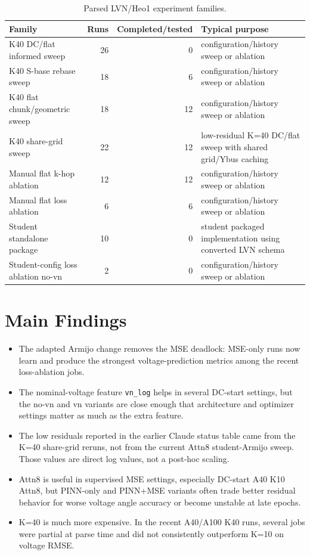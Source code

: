 \documentclass[10pt]{article}
\begin{document}
\begin{table}[h]
\centering
\caption{Parsed LVN/Heo1 experiment families.}
\scriptsize
\begin{tabular}{lrrl}
\toprule
Family & Runs & Completed/tested & Typical purpose \\
\midrule
K40 DC/flat informed sweep & 26 & 0 & configuration/history sweep or ablation \\
K40 S-base rebase sweep & 18 & 6 & configuration/history sweep or ablation \\
K40 flat chunk/geometric sweep & 18 & 12 & configuration/history sweep or ablation \\
K40 share-grid sweep & 22 & 12 & low-residual K=40 DC/flat sweep with shared grid/Ybus caching \\
Manual flat k-hop ablation & 12 & 12 & configuration/history sweep or ablation \\
Manual flat loss ablation & 6 & 6 & configuration/history sweep or ablation \\
Student standalone package & 10 & 0 & student packaged implementation using converted LVN schema \\
Student-config loss ablation no-vn & 2 & 0 & configuration/history sweep or ablation \\
\bottomrule
\end{tabular}
\end{table}


\section{Main Findings}
\begin{itemize}
\item The adapted Armijo change removes the MSE deadlock: MSE-only runs now learn and produce the strongest voltage-prediction metrics among the recent loss-ablation jobs.
\item The nominal-voltage feature \texttt{vn\_log} helps in several DC-start settings, but the no-vn and vn variants are close enough that architecture and optimizer settings matter as much as the extra feature.
\item The low residuals reported in the earlier Claude status table came from the K=40 share-grid reruns, not from the current Attn8 student-Armijo sweep. Those values are direct log values, not a post-hoc scaling.
\item Attn8 is useful in supervised MSE settings, especially DC-start A40 K10 Attn8, but PINN-only and PINN+MSE variants often trade better residual behavior for worse voltage angle accuracy or become unstable at late epochs.
\item K=40 is much more expensive. In the recent A40/A100 K40 runs, several jobs were partial at parse time and did not consistently outperform K=10 on voltage RMSE.
\end{itemize}
\end{document}
